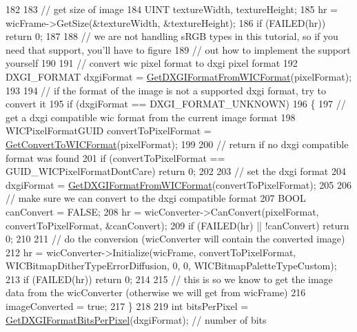 \begin{DoxyCode}
182 
183     \textcolor{comment}{// get size of image}
184     UINT textureWidth, textureHeight;
185     hr = wicFrame->GetSize(&textureWidth, &textureHeight);
186     \textcolor{keywordflow}{if} (FAILED(hr)) \textcolor{keywordflow}{return} 0;
187 
188     \textcolor{comment}{// we are not handling sRGB types in this tutorial, so if you need that support, you'll have to figure}
189     \textcolor{comment}{// out how to implement the support yourself}
190 
191     \textcolor{comment}{// convert wic pixel format to dxgi pixel format}
192     DXGI\_FORMAT dxgiFormat = \mbox{\hyperlink{class_texture_loader_a326429e52878185255290f5bc1ae0219}{GetDXGIFormatFromWICFormat}}(pixelFormat);
193 
194     \textcolor{comment}{// if the format of the image is not a supported dxgi format, try to convert it}
195     \textcolor{keywordflow}{if} (dxgiFormat == DXGI\_FORMAT\_UNKNOWN)
196     \{
197         \textcolor{comment}{// get a dxgi compatible wic format from the current image format}
198         WICPixelFormatGUID convertToPixelFormat = \mbox{\hyperlink{class_texture_loader_a7a5e02ea4500b85ca7dc437f741bd90e}{GetConvertToWICFormat}}(pixelFormat);
199 
200         \textcolor{comment}{// return if no dxgi compatible format was found}
201         \textcolor{keywordflow}{if} (convertToPixelFormat == GUID\_WICPixelFormatDontCare) \textcolor{keywordflow}{return} 0;
202 
203         \textcolor{comment}{// set the dxgi format}
204         dxgiFormat = \mbox{\hyperlink{class_texture_loader_a326429e52878185255290f5bc1ae0219}{GetDXGIFormatFromWICFormat}}(convertToPixelFormat);
205 
206         \textcolor{comment}{// make sure we can convert to the dxgi compatible format}
207         BOOL canConvert = FALSE;
208         hr = wicConverter->CanConvert(pixelFormat, convertToPixelFormat, &canConvert);
209         \textcolor{keywordflow}{if} (FAILED(hr) || !canConvert) \textcolor{keywordflow}{return} 0;
210 
211         \textcolor{comment}{// do the conversion (wicConverter will contain the converted image)}
212         hr = wicConverter->Initialize(wicFrame, convertToPixelFormat, WICBitmapDitherTypeErrorDiffusion, 0,
       0, WICBitmapPaletteTypeCustom);
213         \textcolor{keywordflow}{if} (FAILED(hr)) \textcolor{keywordflow}{return} 0;
214 
215         \textcolor{comment}{// this is so we know to get the image data from the wicConverter (otherwise we will get from
       wicFrame)}
216         imageConverted = \textcolor{keyword}{true};
217     \}
218 
219     \textcolor{keywordtype}{int} bitsPerPixel = \mbox{\hyperlink{class_texture_loader_a32ad2663545df2f57f794d617429ebd1}{GetDXGIFormatBitsPerPixel}}(dxgiFormat); \textcolor{comment}{// number of bits
}
\end{DoxyCode}
